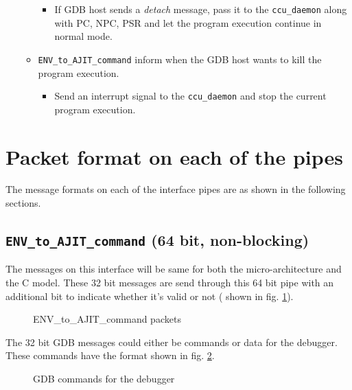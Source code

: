 \documentclass[a4paper, 11pt]{article}
\begin{document}
\begin{itemize}
\begin{itemize}
\begin{itemize}
				\item If GDB host sends a \textit{detach} message, pass it to the \texttt{ccu\_daemon} along with PC, NPC, PSR and let the program execution continue in normal mode.
				\end{itemize}
		\item \texttt{ENV\_to\_AJIT\_command} inform when the GDB host wants to kill the program execution.
		
				\begin{itemize}
				\item Send an interrupt signal to the \texttt{ccu\_daemon} and stop the current program execution.
				\end{itemize}
		\end{itemize}

\end{itemize}

\newpage
\section{Packet format on each of the pipes}
\label{sec:packformat}
The message formats on each of the interface pipes are as shown in the following sections.
\setcounter{subsection}{0}
\subsection{\texttt{ENV\_to\_AJIT\_command} (64 bit, non-blocking)}
The messages on this interface will be same for both the micro-architecture and the C model. These 32 bit messages are send through this 64 bit pipe with an additional bit to indicate whether it's valid or not ( shown in fig. \ref{gdb_packet}).
\begin{figure}[h!]
	\centering
	\caption{ENV\_to\_AJIT\_command packets}
	\label{gdb_packet}
\end{figure}

The 32 bit GDB messages could either be commands or data for the debugger. These commands have the format shown in fig. \ref{packet1}. 

\begin{figure}[h!]
	\centering
	\caption{GDB commands for the debugger}
	\label{packet1}
\end{figure}
\end{document}
